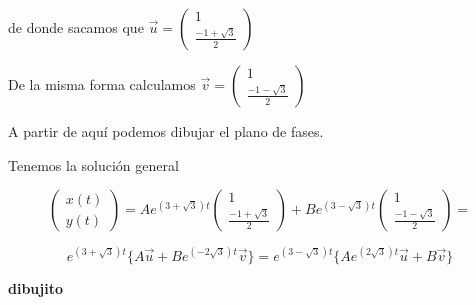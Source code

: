 \begin{example}
de donde sacamos que $\vec{u} = \begin{pmatrix}
1\\\frac{-1+\sqrt{3}}{2}
\end{pmatrix}$

De la misma forma calculamos $\vec{v} = \begin{pmatrix}
1\\\frac{-1-\sqrt{3}}{2}
\end{pmatrix}$

A partir de aquí podemos dibujar el plano de fases.

Tenemos la solución general

$$\begin{pmatrix}
x(t)\\y(t)
\end{pmatrix} = Ae^{(3+\sqrt{3})t}\begin{pmatrix}
1\\\frac{-1+\sqrt{3}}{2}
\end{pmatrix}+Be^{(3-\sqrt{3})t}\begin{pmatrix}
1\\\frac{-1-\sqrt{3}}{2}
\end{pmatrix} = $$

$$e^{(3+\sqrt{3})t}\{ A\vec{u} + Be^{(-2\sqrt{3})t}\vec{v} \} = e^{(3-\sqrt{3})t}\{ Ae^{(2\sqrt{3})t}\vec{u} +B\vec{v} \}$$

\textbf{dibujito}
\end{example}

